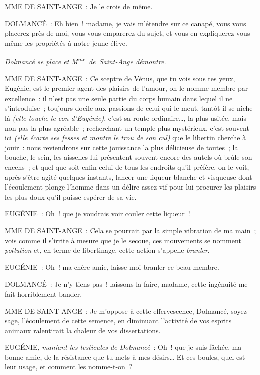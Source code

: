 \documentclass[french,twoside]{book} %
\begin{document}
MME DE SAINT-ANGE : Je le crois de même.\par
DOLMANCÉ : Eh bien ! madame, je vais m’étendre sur ce canapé, vous vous placerez près de moi, vous vous emparerez du sujet, et vous en expliquerez vous-même les propriétés à notre jeune élève.\par
{\itshape Dolmancé se place et M\textsuperscript{me} de Saint-Ange démontre. }\par
MME DE SAINT-ANGE : Ce sceptre de Vénus, que tu vois sous tes yeux, Eugénie, est le premier agent des plaisirs de l’amour, on le nomme membre par excellence : il n’est pas une seule partie du corps humain dans lequel il ne s’introduise ; toujours docile aux passions de celui qui le meut, tantôt il se niche là {\itshape (elle touche le con d’Eugénie)}, c’est sa route ordinaire…, la plus usitée, mais non pas la plus agréable ; recherchant un temple plus mystérieux, c’est souvent ici {\itshape (elle écarte ses fesses et montre le trou de son cul)} que le libertin cherche à jouir : nous reviendrons sur cette jouissance la plus délicieuse de toutes ; la bouche, le sein, les aisselles lui présentent souvent encore des autels où brûle son encens ; et quel que soit enfin celui de tous les endroits qu’il préfère, on le voit, après s’être agité quelques instants, lancer une liqueur blanche et visqueuse dont l’écoulement plonge l’homme dans un délire assez vif pour lui procurer les plaisirs les plus doux qu’il puisse espérer de sa vie.\par
EUGÉNIE : Oh ! que je voudrais voir couler cette liqueur !\par
MME DE SAINT-ANGE : Cela se pourrait par la simple vibration de ma main ; vois comme il s’irrite à mesure que je le secoue, ces mouvements se nomment {\itshape pollution} et, en terme de libertinage, cette action s’appelle {\itshape branler}.\par
EUGÉNIE : Oh ! ma chère amie, laisse-moi branler ce beau membre.\par
DOLMANCÉ : Je n’y tiens pas ! laissons-la faire, madame, cette ingénuité me fait horriblement bander.\par
MME DE SAINT-ANGE : Je m’oppose à cette effervescence, Dolmancé, soyez sage, l’écoulement de cette semence, en diminuant l’activité de vos esprits animaux ralentirait la chaleur de vos dissertations.\par
EUGÉNIE, {\itshape maniant les testicules de Dolmancé} : Oh ! que je suis fâchée, ma bonne amie, de la résistance que tu mets à mes désirs… Et ces boules, quel est leur usage, et comment les nomme-t-on ?\par
\end{document}
